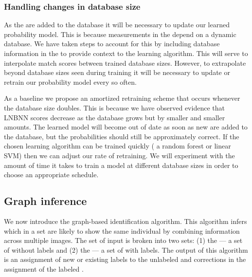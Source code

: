         \subsubsection{Handling changes in database size}
            As the \annots{} are added to the database it will be necessary to
              update our learned probability model.
            This is because measurements in the \matchvecs{} depend on a
              dynamic database.
            We have taken steps to account for this by including database
              information in the \matchvec{} to provide context to the learning
              algorithm.
            This will serve to interpolate match scores between trained
              database sizes.
            However, to extrapolate beyond database sizes seen during training
              it will be necessary to update or retrain our probability model
              every so often.

            As a baseline we propose an amortized retraining scheme that
              occurs whenever the database size doubles.
            This is because we have observed evidence that LNBNN scores
              decrease as the database grows but by smaller and smaller amounts.
            The learned model will become out of date as soon as new \annots{}
              are added to the database, but the probabilities should still be
              approximately correct.
            If the chosen learning algorithm can be trained quickly (\eg{} a
              random forest or linear SVM) then we can adjust our rate of
              retraining.
            We will experiment with the amount of time it takes to train a
              model at different database sizes in order to choose an
              appropriate schedule.

      \subsection{Graph inference}\label{subsec:graphinf}

        We now introduce the graph-based identification algorithm.
        This algorithm infers which \annots{} in a set are likely to show the
          same individual by combining information across multiple images.
        The set of input \annots{} is broken into two sets:
        (1) the \glossterm{\uset{}} --- a set of \annots{} without \name{}
          labels and
        (2) the \glossterm{\lset{}} --- a set of \annots{} with \name{}
          labels.
        The output of this algorithm is an assignment of new or existing
          \name{} labels to the unlabeled \annots{} and corrections in the
          \name{} assignment of the labeled \annots{}.

